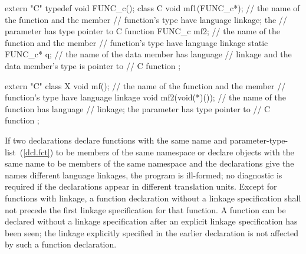 \begin{codeblock}
extern "C" typedef void FUNC_c();
class C {
  void mf1(FUNC_c*);            // the name of the function  and the member
                                // function's type have \Cpp language linkage; the
                                // parameter has type pointer to C function
  FUNC_c mf2;                   // the name of the function  and the member
                                // function's type have \Cpp language linkage
  static FUNC_c* q;             // the name of the data member  has \Cpp language
                                // linkage and the data member's type is pointer to
                                // C function
};

extern "C" {
  class X {
    void mf();                  // the name of the function  and the member
                                // function's type have \Cpp language linkage
    void mf2(void(*)());        // the name of the function  has \Cpp language
                                // linkage; the parameter has type pointer to
                                // C function
  };
}
\end{codeblock}
\exitexample

\pnum
If two declarations declare functions with the same name and
parameter-type-list~(\ref{dcl.fct}) to be members of the same
namespace or declare objects with the same name to be members of the same
namespace and the declarations give the names different language linkages, the
program is ill-formed; no diagnostic is required if the declarations appear in
different translation units.
%
Except for functions with \Cpp linkage, a function declaration without a
linkage specification shall not precede the first linkage specification
for that function. A function can be declared without a linkage
specification after an explicit linkage specification has been seen; the
linkage explicitly specified in the earlier declaration is not affected
by such a function declaration.

